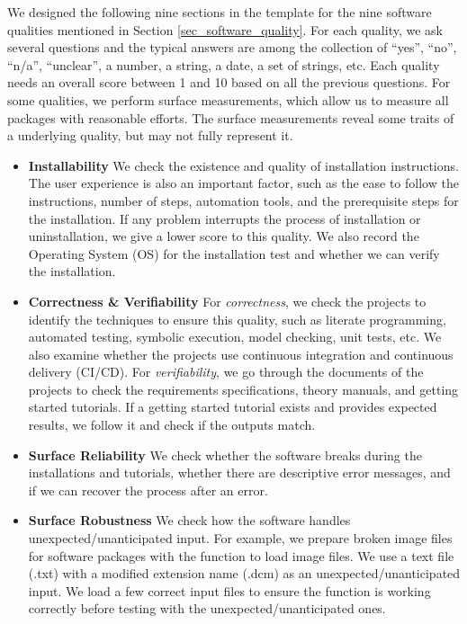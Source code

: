 We designed the following nine sections in the template for the nine software qualities mentioned in Section \ref{sec_software_quality}. For each quality, we ask several questions and the typical answers are among the collection of ``yes'', ``no'', ``n/a'', ``unclear'', a number, a string, a date, a set of strings, etc. Each quality needs an overall score between 1 and 10 based on all the previous questions. For some qualities, we perform surface measurements, which allow us to measure all packages with reasonable efforts. The surface measurements reveal some traits of a underlying quality, but may not fully represent it.

\begin{itemize}
\item \textbf{Installability} We check the existence and quality of installation instructions. The user experience is also an important factor, such as the ease to follow the instructions, number of steps, automation tools, and the prerequisite steps for the installation. If any problem interrupts the process of installation or uninstallation, we give a lower score to this quality. We also record the Operating System (OS) for the installation test and whether we can verify the installation.

\item \textbf{Correctness \& Verifiability} For \textit{correctness}, we check the projects to identify the techniques to ensure this quality, such as literate programming, automated testing, symbolic execution, model checking, unit tests, etc. We also examine whether the projects use continuous integration and continuous delivery (CI/CD). For \textit{verifiability}, we go through the documents of the projects to check the requirements specifications, theory manuals, and getting started tutorials. If a getting started tutorial exists and provides expected results, we follow it and check if the outputs match.

\item \textbf{Surface Reliability} We check whether the software breaks during the installations and tutorials, whether there are descriptive error messages, and if we can recover the process after an error.

\item \textbf{Surface Robustness} We check how the software handles unexpected/unanticipated input. For example, we prepare broken image files for software packages with the function to load image files. We use a text file (.txt) with a modified extension name (.dcm) as an unexpected/unanticipated input. We load a few correct input files to ensure the function is working correctly before testing with the unexpected/unanticipated ones.


\end{itemize}
